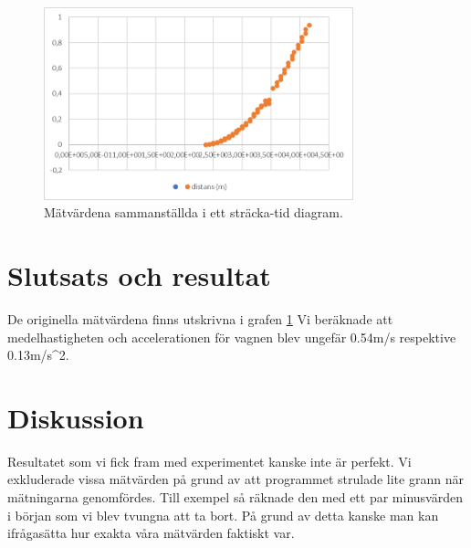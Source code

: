 \documentclass[11p, titlepage, oneside, a4paper]{article}
\begin{document}
    \begin{figure}[!h]
        \includegraphics[width=0.8\textwidth]{images/img_1.png}
        \caption{Mätvärdena sammanställda i ett sträcka-tid diagram.}
        \label{fig:graf1}
    \end{figure}
    
    \section{Slutsats och resultat}
    De originella mätvärdena finns utskrivna i grafen \ref{fig:graf1}
    Vi beräknade att medelhastigheten och accelerationen för vagnen blev ungefär 0.54m/s respektive 0.13m/s^2.
    \section{Diskussion} 
    Resultatet som vi fick fram med experimentet kanske inte är perfekt. Vi exkluderade vissa mätvärden på grund av att programmet strulade lite grann när mätningarna genomfördes. Till exempel så räknade den med ett par minusvärden i början som vi blev tvungna att ta bort. På grund av detta kanske man kan ifrågasätta hur exakta våra mätvärden faktiskt var.

    
    \printbibliography
\end{document}
